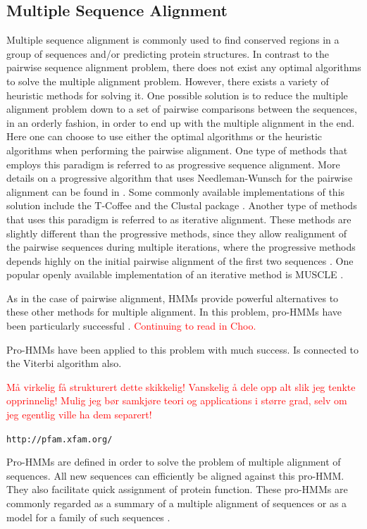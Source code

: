 \documentclass{article}
\begin{document}
\subsection{Multiple Sequence Alignment}
Multiple sequence alignment is commonly used to find conserved regions in a group of sequences and/or predicting protein structures. In contrast to the pairwise sequence alignment problem, there does not exist any optimal algorithms to solve the multiple alignment problem. However, there exists a variety of heuristic methods for solving it. One possible solution is to reduce the multiple alignment problem down to a set of pairwise comparisons between the sequences, in an orderly fashion, in order to end up with the multiple alignment in the end. Here one can choose to use either the optimal algorithms or the heuristic algorithms when performing the pairwise alignment. One type of methods that employs this paradigm is referred to as progressive sequence alignment. More details on a progressive algorithm that uses Needleman-Wunsch for the pairwise alignment can be found in \cite{Feng1987}. Some commonly available implementations of this solution include the T-Coffee and the Clustal package \cite{EMBL-EBI-Multiple}. Another type of methods that uses this paradigm is referred to as iterative alignment. These methods are slightly different than the progressive methods, since they allow realignment of the pairwise sequences during multiple iterations, where the progressive methods depends highly on the initial pairwise alignment of the first two sequences \cite{BioInfoOrgMSA}. One popular openly available implementation of an iterative method is MUSCLE \cite{EMBL-EBI-Multiple}. 

As in the case of pairwise alignment, HMMs provide powerful alternatives to these other methods for multiple alignment. In this problem, pro-HMMs have been particularly successful \cite{Choo2004}. \textcolor{red}{Continuing to read in Choo.}

Pro-HMMs have been applied to this problem with much success. Is connected to the Viterbi algorithm also.   

\textcolor{red}{Må virkelig få strukturert dette skikkelig! Vanskelig å dele opp alt slik jeg tenkte opprinnelig! Mulig jeg bør samkjøre teori og applications i større grad, selv om jeg egentlig ville ha dem separert!}

\verb$http://pfam.xfam.org/$

Pro-HMMs are defined in order to solve the problem of multiple alignment of sequences. All new sequences can efficiently be aligned against this pro-HMM. They also facilitate quick assignment of protein function. These pro-HMMs are commonly regarded as a summary of a multiple alignment of sequences or as a model for a family of such sequences \cite{Christianini2006}. 
\end{document}

